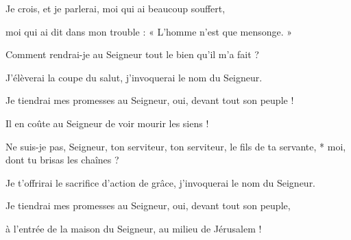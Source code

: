 \item Je crois, et je parlerai, moi qui ai beaucoup souffert,

\item moi qui ai dit dans mon trouble : « L'homme n'est que mensonge. »

\item Comment rendrai-je au Seigneur tout le bien qu'il m'a fait ?

\item J'élèverai la coupe du salut, j'invoquerai le nom du Seigneur.

\item Je tiendrai mes promesses au Seigneur, oui, devant tout son peuple !

\item Il en coûte au Seigneur de voir mourir les siens !

\item Ne suis-je pas, Seigneur, ton serviteur, ton serviteur, le fils de ta servante, * moi, dont tu brisas les chaînes ?

\item Je t'offrirai le sacrifice d'action de grâce, j'invoquerai le nom du Seigneur.

\item Je tiendrai mes promesses au Seigneur, oui, devant tout son peuple,

\item à l'entrée de la maison du Seigneur, au milieu de Jérusalem !
